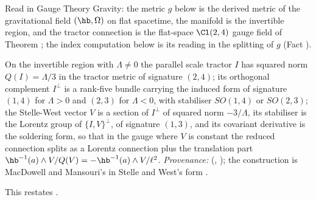 Read in Gauge Theory Gravity: the metric $g$ below is the derived metric of the gravitational field $(\hb, \Omega)$ on flat spacetime, the manifold is the invertible region, and the tractor connection is the flat-space $\Cl(2,4)$ gauge field of Theorem ; the index computation below is its reading in the splitting of $g$ (Fact ).

On the invertible region with $\Lambda \neq 0$ the parallel scale tractor $I$ has squared norm $Q(I) = \Lambda/3$ in the tractor metric of signature $(2,4)$; its orthogonal complement $I^{\perp}$ is a rank-five bundle carrying the induced form of signature $(1,4)$ for $\Lambda > 0$ and $(2,3)$ for $\Lambda < 0$, with stabiliser $SO(1,4)$ or $SO(2,3)$; the Stelle-West vector $V$ is a section of $I^{\perp}$ of squared norm $-3/\Lambda$, its stabiliser is the Lorentz group of $\{I, V\}^{\perp}$, of signature $(1,3)$, and its covariant derivative is the soldering form, so that in the gauge where $V$ is constant the reduced connection splits as a Lorentz connection plus the translation part $\hb^{-1}(a)\wedge V/Q(V) = -\hb^{-1}(a)\wedge V/\ell^{2}$. \emph{Provenance:} \cite[Fact~2.1, Thm.~3.1]{ButlerT10} (, ); the construction is MacDowell and Mansouri's \cite{MacDowellMansouri1977} in Stelle and West's form \cite{StelleWest1980}.

This restates .

